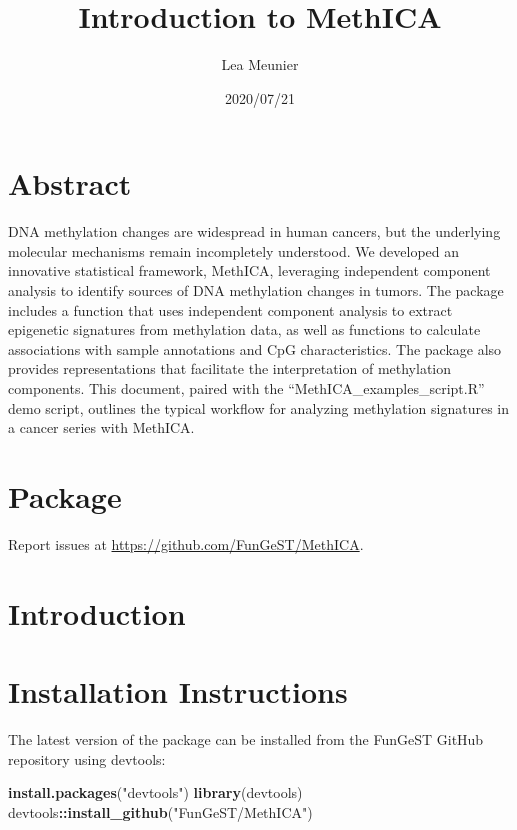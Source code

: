 \documentclass[]{article}
\title{Introduction to MethICA}
\author{Lea Meunier}
\date{2020/07/21}
\newenvironment{Shaded}{\begin{snugshade}}{\end{snugshade}}
\newcommand{\KeywordTok}[1]{\textcolor[rgb]{0.13,0.29,0.53}{\textbf{#1}}}
\newcommand{\NormalTok}[1]{#1}
\newcommand{\OperatorTok}[1]{\textcolor[rgb]{0.81,0.36,0.00}{\textbf{#1}}}
\newcommand{\StringTok}[1]{\textcolor[rgb]{0.31,0.60,0.02}{#1}}
\begin{document}
\maketitle

\hypertarget{abstract}{%
\section{Abstract}\label{abstract}}

DNA methylation changes are widespread in human cancers, but the
underlying molecular mechanisms remain incompletely understood. We
developed an innovative statistical framework, MethICA, leveraging
independent component analysis to identify sources of DNA methylation
changes in tumors. The package includes a function that uses independent
component analysis to extract epigenetic signatures from methylation
data, as well as functions to calculate associations with sample
annotations and CpG characteristics. The package also provides
representations that facilitate the interpretation of methylation
components. This document, paired with the
``MethICA\_examples\_script.R'' demo script, outlines the typical
workflow for analyzing methylation signatures in a cancer series with
MethICA.

\hypertarget{package}{%
\section{Package}\label{package}}

Report issues at \url{https://github.com/FunGeST/MethICA}.

\newpage

\hypertarget{introduction}{%
\section{Introduction}\label{introduction}}

\hypertarget{installation-instructions}{%
\section{Installation Instructions}\label{installation-instructions}}

The latest version of the package can be installed from the FunGeST
GitHub repository using devtools:

\begin{Shaded}
\begin{Highlighting}[]
\KeywordTok{install.packages}\NormalTok{(}\StringTok{"devtools"}\NormalTok{)}
\KeywordTok{library}\NormalTok{(devtools)}
\NormalTok{devtools}\OperatorTok{::}\KeywordTok{install_github}\NormalTok{(}\StringTok{"FunGeST/MethICA"}\NormalTok{)}
\end{Highlighting}
\end{Shaded}
\end{document}
